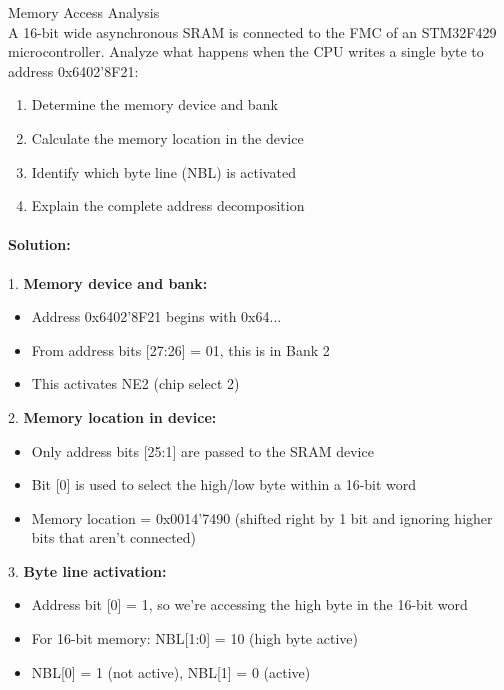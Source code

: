 \begin{example2}{Memory Access Analysis}\\
A 16-bit wide asynchronous SRAM is connected to the FMC of an STM32F429 microcontroller. Analyze what happens when the CPU writes a single byte to address 0x6402'8F21:

\begin{enumerate}
    \item Determine the memory device and bank
    \item Calculate the memory location in the device
    \item Identify which byte line (NBL) is activated
    \item Explain the complete address decomposition
\end{enumerate}

\tcblower
\paragraph{Solution:}

1. \textbf{Memory device and bank:}
   \begin{itemize}
     \item Address 0x6402'8F21 begins with 0x64...
     \item From address bits [27:26] = 01, this is in Bank 2
     \item This activates NE2 (chip select 2)
   \end{itemize}

2. \textbf{Memory location in device:}
   \begin{itemize}
     \item Only address bits [25:1] are passed to the SRAM device
     \item Bit [0] is used to select the high/low byte within a 16-bit word
     \item Memory location = 0x0014'7490 (shifted right by 1 bit and ignoring higher bits that aren't connected)
   \end{itemize}

3. \textbf{Byte line activation:}
   \begin{itemize}
     \item Address bit [0] = 1, so we're accessing the high byte in the 16-bit word
     \item For 16-bit memory: NBL[1:0] = 10 (high byte active)
     \item NBL[0] = 1 (not active), NBL[1] = 0 (active)
   \end{itemize}


\end{example2}
